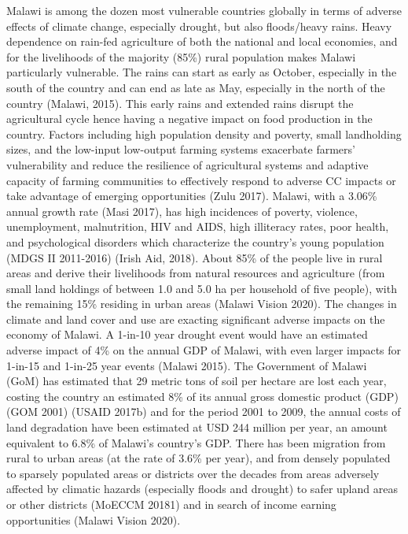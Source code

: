 \documentclass[
]{book}
\begin{document}
Malawi is among the dozen most vulnerable countries globally in terms of adverse effects of climate change, especially drought, but also floods/heavy rains.
Heavy dependence on rain-fed agriculture of both the national and local economies, and for the livelihoods of the majority (85\%) rural population makes Malawi
particularly vulnerable. The rains can start as early as October, especially in the south of the country and can end as late as May, especially in the north of
the country (Malawi, 2015). This early rains and extended rains disrupt the agricultural cycle hence having a negative impact on food production in the country.
Factors including high population density and poverty, small landholding sizes, and the low-input low-output farming systems exacerbate farmers' vulnerability
and reduce the resilience of agricultural systems and adaptive capacity of farming communities to effectively respond to adverse CC impacts or take advantage of
emerging opportunities (Zulu 2017). Malawi, with a 3.06\% annual growth rate (Masi 2017), has high incidences of poverty, violence, unemployment, malnutrition,
HIV and AIDS, high illiteracy rates, poor health, and psychological disorders which characterize the country's young population (MDGS II 2011-2016) (Irish Aid,
2018). About 85\% of the people live in rural areas and derive their livelihoods from natural resources and agriculture (from small land holdings of between 1.0
and 5.0 ha per household of five people), with the remaining 15\% residing in urban areas (Malawi Vision 2020). The changes in climate and land cover and use are
exacting significant adverse impacts on the economy of Malawi. A 1-in-10 year drought event would have an estimated adverse impact of 4\% on the annual GDP of
Malawi, with even larger impacts for 1-in-15 and 1-in-25 year events (Malawi 2015). The Government of Malawi (GoM) has estimated that 29 metric tons of soil per
hectare are lost each year, costing the country an estimated 8\% of its annual gross domestic product (GDP) (GOM 2001) (USAID 2017b) and for the period 2001 to
2009, the annual costs of land degradation have been estimated at USD 244 million per year, an amount equivalent to 6.8\% of Malawi's country's GDP. There has
been migration from rural to urban areas (at the rate of 3.6\% per year), and from densely populated to sparsely populated areas or districts over the decades
from areas adversely affected by climatic hazards (especially floods and drought) to safer upland areas or other districts (MoECCM 20181) and in search of income
earning opportunities (Malawi
Vision 2020).
\end{document}

